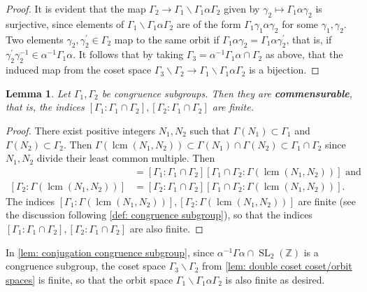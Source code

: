 \documentclass[10pt,leqno,twoside]{article}
\theoremstyle{plain}
\newtheorem{lemma}[lem]{Lemma}
\theoremstyle{definition}
\numberwithin{equation}{section}
\numberwithin{lem}{section}
\newcommand{\textib}[1]{\textbf{\textit{#1\index{#1}}}} %
\DeclareMathOperator{\SL}{SL}
\newcommand{\slz}{\SL_2(\mathbb{Z})}
\DeclareMathOperator{\lcm}{lcm}
\begin{document}
\begin{proof}
    It is evident that the map $\varGamma_2\to \varGamma_1\backslash\varGamma_1\alpha\varGamma_2$ given by $\gamma_2\mapsto \varGamma_1\alpha\gamma_2$ is surjective, since elements of $\varGamma_1\backslash\varGamma_1\alpha\varGamma_2$ are of the form $\varGamma_1\gamma_1\alpha\gamma_2$ for some $\gamma_1,\gamma_2$. Two elements $\gamma_2,\gamma_2^\prime\in\varGamma_2$ map to the same orbit if $\varGamma_1\alpha\gamma_2 = \varGamma_1\alpha\gamma_2^\prime$, that is, if $\gamma_2^\prime\gamma_2^{-1}\in \alpha^{-1}\varGamma_1\alpha$. It follows that by taking $\varGamma_3 = \alpha^{-1}\varGamma_1\alpha\cap \varGamma_2$ as above, that the induced map from the coset space $\varGamma_3\backslash\varGamma_2\to \varGamma_1\backslash \varGamma_1\alpha\varGamma_2$ is a bijection.
\end{proof}
\begin{lemma}\label{lem: congruence subgroups commensurable}
    Let $\varGamma_1,\varGamma_2$ be congruence subgroups. Then they are \textib{commensurable}, that is, the indices $[\varGamma_1 : \varGamma_1\cap \varGamma_2], [\varGamma_2 : \varGamma_1\cap \varGamma_2]$ are finite.
\end{lemma}
\begin{proof}
    There exist positive integers $N_1,N_2$ such that $\varGamma(N_1)\subset \varGamma_1$ and $\varGamma(N_2)\subset \varGamma_2$. Then $\varGamma(\lcm(N_1,N_2))\subset \varGamma(N_1)\cap \varGamma(N_2)\subset \varGamma_1\cap \varGamma_2$ since $N_1,N_2$ divide their least common multiple. Then \begin{align*}
        [\varGamma_1 : \varGamma(\lcm(N_1,N_2))] &= [\varGamma_1 : \varGamma_1\cap \varGamma_2][\varGamma_1\cap \varGamma_2 : \varGamma(\lcm(N_1,N_2))] \text{ and}\\
        [\varGamma_2 : \varGamma(\lcm(N_1,N_2))] &= [\varGamma_2 : \varGamma_1\cap \varGamma_2][\varGamma_1\cap \varGamma_2 : \varGamma(\lcm(N_1,N_2))].
    \end{align*} The indices $[\varGamma_1 : \varGamma(\lcm(N_1,N_2))],[\varGamma_2 : \varGamma(\lcm(N_1,N_2))]$ are finite (see the discussion following \cref{def: congruence subgroup}), so that the indices $[\varGamma_1 : \varGamma_1\cap \varGamma_2], [\varGamma_2 : \varGamma_1\cap \varGamma_2]$ are also finite.
\end{proof}
In \cref{lem: conjugation congruence subgroup}, since $\alpha^{-1}\varGamma\alpha\cap\slz$ is a congruence subgroup, the coset space $\varGamma_3\backslash \varGamma_2$ from \cref{lem: double coset coset/orbit spaces} is finite, so that the orbit space $\varGamma_1\backslash \varGamma_1\alpha\varGamma_2$ is also finite as desired.
\end{document}
